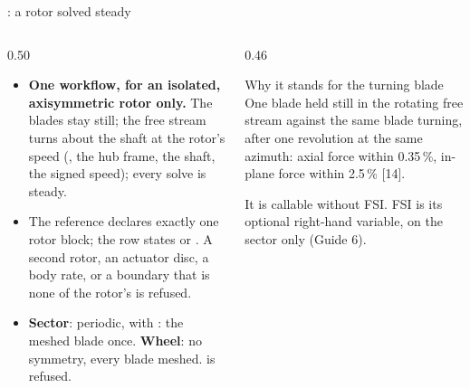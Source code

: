 \begin{frame}{: a rotor solved steady}
\begin{columns}[T]
\begin{column}{0.50\textwidth}
\begin{itemize}\small
  \item \textbf{One workflow, for an isolated, axisymmetric rotor only.} The
        blades stay still; the free stream turns about the shaft at the
        rotor's speed (, the hub frame, the
        shaft, the signed speed); every solve is steady.
  \item The reference declares exactly one rotor block; the row states
         or . A second rotor, an actuator disc,
        a body rate, or a boundary that is none of the rotor's is refused.
  \item \textbf{Sector}:  periodic, with
        : the meshed blade once. \textbf{Wheel}: no
        symmetry, every blade meshed.  is refused.
\end{itemize}
\end{column}
\begin{column}{0.46\textwidth}
\begin{block}{Why it stands for the turning blade}
\small One blade held still in the rotating free stream against the same
blade turning, after one revolution at the same azimuth: axial force within
0.35\,\%, in-plane force within 2.5\,\% [14].
\end{block}
\begin{takeaway}It is callable without FSI. FSI is its optional right-hand
variable, on the sector only (Guide 6).\end{takeaway}
\end{column}
\end{columns}
\end{frame}

